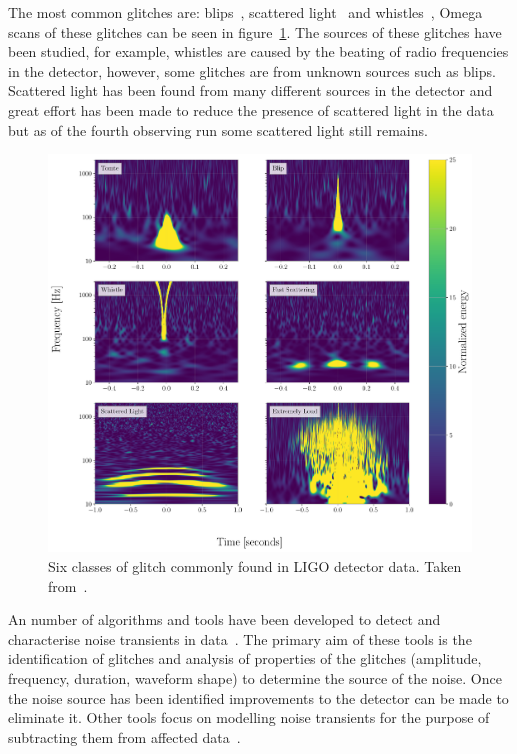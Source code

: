 The most common glitches are: blips~\cite{blips:2019}, scattered light~\cite{ArchEnemy:2023} and whistles~\cite{glitschen:2021}, Omega scans of these glitches can be seen in figure~\ref{3:fig:glitches_subset}. The sources of these glitches have been studied, for example, whistles are caused by the beating of radio frequencies in the detector, however, some glitches are from unknown sources such as blips. Scattered light has been found from many different sources in the detector and great effort has been made to reduce the presence of scattered light in the data~\cite{reducing_scattering:2020} but as of the fourth observing run some scattered light still remains.
%
\begin{figure}
    \centering
    \includegraphics[width=1.0\linewidth]{images/3_detector_characterisation/glitches_subset.pdf}
    \caption{Six classes of glitch commonly found in LIGO detector data. Taken from~\cite{GlitchPlot:2024, gravityspy:2023}.}
    \label{3:fig:glitches_subset}
\end{figure}
%


An number of algorithms and tools have been developed to detect and characterise noise transients in \gwadj data~\cite{ArchEnemy:2023, reducing_scattering:2020, Glanzer:2023, gravityspy:2017, gravityspy:2021, gravityspy:2023, glitschen:2021,  BayesWave:2015, gwadaptive:2022, O3_subtraction:2022, Powell:2016, glitschen:2021}. The primary aim of these tools is the identification of glitches and analysis of properties of the glitches (amplitude, frequency, duration, waveform shape) to determine the source of the noise. Once the noise source has been identified improvements to the detector can be made to eliminate it. Other tools focus on modelling noise transients for the purpose of subtracting them from affected \gwadj data~\cite{ArchEnemy:2023, BayesWave:2015, glitschen:2021, antiglitch:2023}.
%
%

